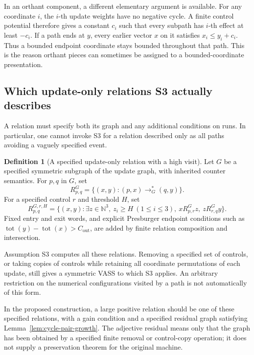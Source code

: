 \documentclass[11pt,a4paper]{article}
\theoremstyle{definition}
\newtheorem{definition}[theorem]{Definition}
\theoremstyle{remark}
\newcommand{\N}{\mathbb N}
\newcommand{\Co}{C_{\mathrm{out}}}
\newcommand{\tot}[1]{\operatorname{tot}(#1)}
\begin{document}
In an orthant component, a different elementary argument is
available. For any coordinate \(i\), the \(i\)-th update weights
have no negative cycle. A finite control potential therefore gives
a constant \(c_i\) such that every subpath has \(i\)-th effect at
least \(-c_i\). If a path ends at \(y\), every earlier vector \(x\)
on it satisfies \(x_i\le y_i+c_i\).
Thus a bounded endpoint coordinate stays bounded throughout that
path. This is the reason orthant pieces can sometimes be assigned
to a bounded-coordinate presentation.

\subsection{Which update-only relations S3 actually describes}

A relation must specify both its graph and any additional conditions
on runs. In particular, one cannot invoke S3 for a relation described
only as all paths avoiding a vaguely specified event.

\begin{definition}[A specified update-only relation with a high visit]
\label{def:specified-update}
Let \(G\) be a specified symmetric subgraph of the update graph,
with inherited counter semantics. For \(p,q\) in \(G\), set
\[
 R^G_{p,q}=\{(x,y):(p,x)\longrightarrow_G^*(q,y)\}.
\]
For a specified control \(r\) and threshold \(H\), set
\[
 R^{G,r,H}_{p,q}
 =\{(x,y):\exists z\in\N^3,\
       z_i\ge H\ (1\le i\le3),\
       xR^G_{p,r}z,\ zR^G_{r,q}y\}.
\]
Fixed entry and exit words, and explicit Presburger endpoint
conditions such as \(\tot y-\tot x>\Co\), are added by finite
relation composition and intersection.
\end{definition}

Assumption S3 computes all these relations. Removing a specified
set of controls, or taking copies of controls while retaining all
coordinate permutations of each update, still gives a symmetric
VASS to which S3 applies. An arbitrary restriction on the numerical
configurations visited by a path is not automatically of this form.

In the proposed construction, a large positive relation should be
one of these specified relations, with a gain condition and a
specified residual graph satisfying Lemma~\ref{lem:cycle-pair-growth}.
The adjective residual means only that the graph has been obtained
by a specified finite removal or control-copy operation; it does
not supply a preservation theorem for the original machine.
\end{document}
